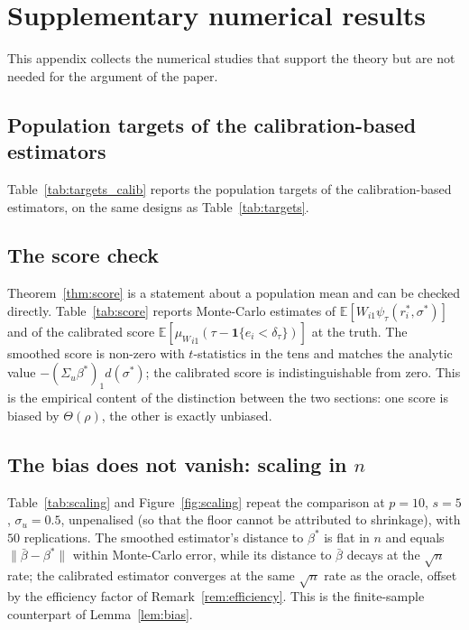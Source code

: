 \documentclass[12pt,a4paper]{article}
\theoremstyle{definition}
\theoremstyle{remark}
\newcommand{\E}{\mathbb{E}}
\newcommand{\ind}[1]{\mathbf{1}\{#1\}}
\newcommand{\norm}[1]{\|#1\|}
\newcommand{\psit}{\psi_\tau}
\newcommand{\betas}{\beta^*}
\newcommand{\bbar}{\bar{\beta}}
\newcommand{\muv}{\mu_W}
\begin{document}
\section{Supplementary numerical results}
\label{app:numerics}

This appendix collects the numerical studies that support the theory but are
not needed for the argument of the paper.

\subsection{Population targets of the calibration-based estimators}
\label{sec:targets-calib-si}

Table~\ref{tab:targets_calib} reports the population targets of the
calibration-based estimators, on the same designs as Table~\ref{tab:targets}.



\subsection{The score check}
\label{sec:scorecheck}

Theorem~\ref{thm:score} is a statement about a population mean and can be checked
directly. Table~\ref{tab:score} reports Monte-Carlo estimates of
$\E[W_{i1}\psit(r_i^*,\sigma^*)]$ and of the calibrated score
$\E[{\muv}_{i1}(\tau-\ind{e_i<\delta_\tau})]$ at the truth. The smoothed score is non-zero
with $t$-statistics in the tens and matches the analytic value $-(\Sigma_u\betas)_1d(\sigma^*)$;
the calibrated score is indistinguishable from zero. This is the empirical content of the
distinction between the two sections: one score is biased by $\Theta(\rho)$, the other is
exactly unbiased.



\subsection{The bias does not vanish: scaling in $n$}
\label{sec:scaling}

Table~\ref{tab:scaling} and Figure~\ref{fig:scaling} repeat the comparison at
$p=10$, $s=5$, $\sigma_u=0.5$, unpenalised (so that the floor cannot be attributed to
shrinkage), with $50$ replications. The smoothed estimator's distance to $\betas$ is flat
in $n$ and equals $\norm{\bbar-\betas}$ within Monte-Carlo error, while its distance to
$\bbar$ decays at the $\sqrt{n}$ rate; the calibrated estimator converges at the same
$\sqrt{n}$ rate as the oracle, offset by the efficiency factor of
Remark~\ref{rem:efficiency}. This is the finite-sample counterpart of Lemma~\ref{lem:bias}.
\end{document}
